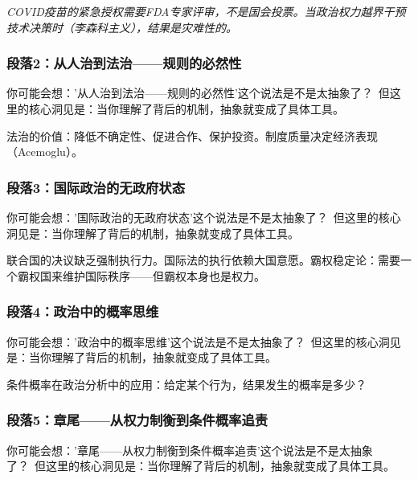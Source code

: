 \documentclass[a4paper,12pt]{book}
\newenvironment{motivation}{\begin{tcolorbox}[colback=gray!10,colframe=gray!60,title=\textit{动机}]\small\itshape}{\end{tcolorbox}}
\begin{document}
\begin{motivation}
\begin{motivation}
\begin{motivation}
COVID疫苗的紧急授权需要FDA专家评审，不是国会投票。当政治权力越界干预技术决策时（李森科主义），结果是灾难性的。

	\subsubsection*{段落2：从人治到法治——规则的必然性}

	\begin{tcolorbox}[colback=yellow!5, title=\textit{读者行为预测}]
		你可能会想：'从人治到法治——规则的必然性'这个说法是不是太抽象了？\ 但这里的核心洞见是：当你理解了背后的机制，抽象就变成了具体工具。
	\end{tcolorbox}

法治的价值：降低不确定性、促进合作、保护投资。制度质量决定经济表现（Acemoglu）。

	\subsubsection*{段落3：国际政治的无政府状态}

	\begin{tcolorbox}[colback=yellow!5, title=\textit{读者行为预测}]
		你可能会想：'国际政治的无政府状态'这个说法是不是太抽象了？\ 但这里的核心洞见是：当你理解了背后的机制，抽象就变成了具体工具。
	\end{tcolorbox}

联合国的决议缺乏强制执行力。国际法的执行依赖大国意愿。霸权稳定论：需要一个霸权国来维护国际秩序——但霸权本身也是权力。

	\subsubsection*{段落4：政治中的概率思维}

	\begin{tcolorbox}[colback=yellow!5, title=\textit{读者行为预测}]
		你可能会想：'政治中的概率思维'这个说法是不是太抽象了？\ 但这里的核心洞见是：当你理解了背后的机制，抽象就变成了具体工具。
	\end{tcolorbox}

条件概率在政治分析中的应用：给定某个行为，结果发生的概率是多少？

	\subsubsection*{段落5：章尾——从权力制衡到条件概率追责}

	\begin{tcolorbox}[colback=yellow!5, title=\textit{读者行为预测}]
		你可能会想：'章尾——从权力制衡到条件概率追责'这个说法是不是太抽象了？\ 但这里的核心洞见是：当你理解了背后的机制，抽象就变成了具体工具。
	\end{tcolorbox}


\end{motivation}
\end{motivation}
\end{motivation}
\end{document}
